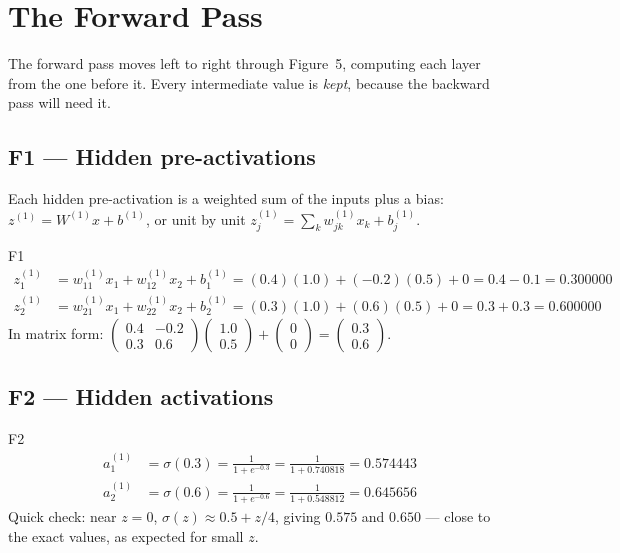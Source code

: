 \documentclass[11pt]{article}
\begin{document}
\section{The Forward Pass}
The forward pass moves left to right through Figure~5, computing each layer from the one before it. Every intermediate value is \emph{kept}, because the backward pass will need it.

\subsection{F1 --- Hidden pre-activations}
Each hidden pre-activation is a weighted sum of the inputs plus a bias: $z^{(1)}=W^{(1)}x+b^{(1)}$, or unit by unit $z^{(1)}_j=\sum_k w^{(1)}_{jk}x_k+b^{(1)}_j$.
\begin{example}{F1}
\begin{align*}
z^{(1)}_1&=w^{(1)}_{11}x_1+w^{(1)}_{12}x_2+b^{(1)}_1=(0.4)(1.0)+(-0.2)(0.5)+0=0.4-0.1=\mathbf{0.300000}\\
z^{(1)}_2&=w^{(1)}_{21}x_1+w^{(1)}_{22}x_2+b^{(1)}_2=(0.3)(1.0)+(0.6)(0.5)+0=0.3+0.3=\mathbf{0.600000}
\end{align*}
In matrix form: $\begin{pmatrix}0.4&-0.2\\0.3&0.6\end{pmatrix}\begin{pmatrix}1.0\\0.5\end{pmatrix}+\begin{pmatrix}0\\0\end{pmatrix}=\begin{pmatrix}0.3\\0.6\end{pmatrix}$.
\end{example}

\subsection{F2 --- Hidden activations}
\begin{example}{F2}
\begin{align*}
a^{(1)}_1&=\sigma(0.3)=\frac{1}{1+e^{-0.3}}=\frac{1}{1+0.740818}=\mathbf{0.574443}\\[2pt]
a^{(1)}_2&=\sigma(0.6)=\frac{1}{1+e^{-0.6}}=\frac{1}{1+0.548812}=\mathbf{0.645656}
\end{align*}
Quick check: near $z=0$, $\sigma(z)\approx0.5+z/4$, giving $0.575$ and $0.650$ --- close to the exact values, as expected for small $z$.
\end{example}
\end{document}
